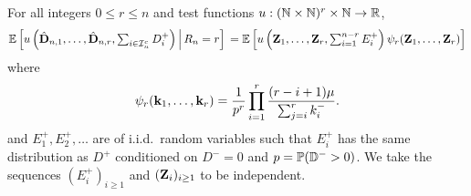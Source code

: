 \begin{lemma}
    \label{lem:exact-measure-change-no-conditioning}
    For all integers $0 \leq r \leq n$ and test functions $u: ({\mathbb N} \times {\mathbb N})^r \times {\mathbb N} \to {\mathbb R}$,
    \begin{equation*}
        {\mathbb E} \left[ u\left( 
            \hat{{\mathbf D}}_{n, 1}, \ldots, \hat{{\mathbf D}}_{n, r}, \textstyle \sum_{i \in {\mathcal I}_n^c} D_i^+
        \right) \,\middle\vert\, R_n = r \right] \\
        =
        {\mathbb E} \left[
            u\left( {\mathbf Z}_1, \ldots, {\mathbf Z}_r, \textstyle \sum_{i = 1}^{n-r} E_i^+ \right)
            \psi_r({\mathbf Z}_1, \ldots, {\mathbf Z}_r)
        \right]
    \end{equation*}
    where
    \begin{equation*}
        \psi_r({\mathbf k}_1, \ldots, {\mathbf k}_r) =
        \frac{1}{p^r} \prod_{i=1}^r \frac{(r - i + 1)\mu}{\sum_{j=i}^r k_i^-}.
    \end{equation*}
    and $E_1^+, E_2^+, \ldots$ are of i.i.d.\ random variables such that $E_i^+$ has the same distribution as $D^+$ conditioned on $D^- = 0$ and $p = {\mathbb P}({\mathbb D}^- > 0)$. We take the sequences $(E_i^+)_{i \geq 1}$ and $({\mathbf Z}_i)_{i \geq 1}$ to be independent.
\end{lemma}

